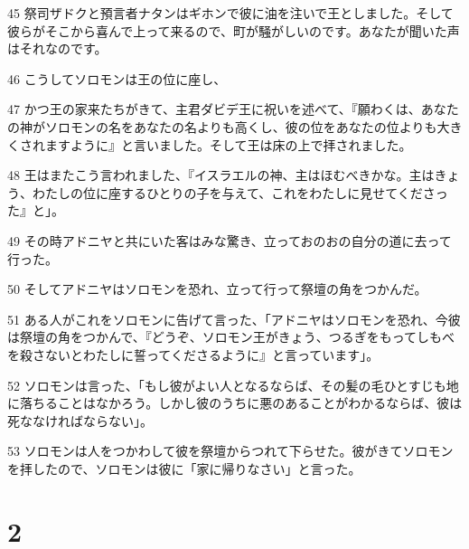 \par 45 祭司ザドクと預言者ナタンはギホンで彼に油を注いで王としました。そして彼らがそこから喜んで上って来るので、町が騒がしいのです。あなたが聞いた声はそれなのです。
\par 46 こうしてソロモンは王の位に座し、
\par 47 かつ王の家来たちがきて、主君ダビデ王に祝いを述べて、『願わくは、あなたの神がソロモンの名をあなたの名よりも高くし、彼の位をあなたの位よりも大きくされますように』と言いました。そして王は床の上で拝されました。
\par 48 王はまたこう言われました、『イスラエルの神、主はほむべきかな。主はきょう、わたしの位に座するひとりの子を与えて、これをわたしに見せてくださった』と」。
\par 49 その時アドニヤと共にいた客はみな驚き、立っておのおの自分の道に去って行った。
\par 50 そしてアドニヤはソロモンを恐れ、立って行って祭壇の角をつかんだ。
\par 51 ある人がこれをソロモンに告げて言った、「アドニヤはソロモンを恐れ、今彼は祭壇の角をつかんで、『どうぞ、ソロモン王がきょう、つるぎをもってしもべを殺さないとわたしに誓ってくださるように』と言っています」。
\par 52 ソロモンは言った、「もし彼がよい人となるならば、その髪の毛ひとすじも地に落ちることはなかろう。しかし彼のうちに悪のあることがわかるならば、彼は死ななければならない」。
\par 53 ソロモンは人をつかわして彼を祭壇からつれて下らせた。彼がきてソロモンを拝したので、ソロモンは彼に「家に帰りなさい」と言った。

\chapter{2}

